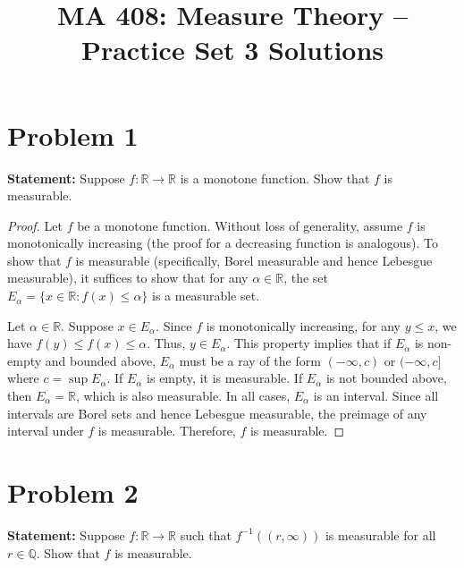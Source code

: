 \documentclass[12pt]{article}
\title{MA 408: Measure Theory -- Practice Set 3 Solutions}
\author{}
\date{}
\begin{document}
\maketitle

\section*{Problem 1}
\textbf{Statement:} Suppose $f:\mathbb{R}\rightarrow\mathbb{R}$ is a monotone function. Show that $f$ is measurable.

\begin{proof}
Let $f$ be a monotone function. Without loss of generality, assume $f$ is monotonically increasing (the proof for a decreasing function is analogous). To show that $f$ is measurable (specifically, Borel measurable and hence Lebesgue measurable), it suffices to show that for any $\alpha \in \mathbb{R}$, the set $E_\alpha = \{x \in \mathbb{R} : f(x) \le \alpha\}$ is a measurable set.

Let $\alpha \in \mathbb{R}$. Suppose $x \in E_\alpha$. Since $f$ is monotonically increasing, for any $y \le x$, we have $f(y) \le f(x) \le \alpha$. Thus, $y \in E_\alpha$. 
This property implies that if $E_\alpha$ is non-empty and bounded above, $E_\alpha$ must be a ray of the form $(-\infty, c)$ or $(-\infty, c]$ where $c = \sup E_\alpha$. 
If $E_\alpha$ is empty, it is measurable. If $E_\alpha$ is not bounded above, then $E_\alpha = \mathbb{R}$, which is also measurable. 
In all cases, $E_\alpha$ is an interval. Since all intervals are Borel sets and hence Lebesgue measurable, the preimage of any interval under $f$ is measurable. Therefore, $f$ is measurable.
\end{proof}

\section*{Problem 2}
\textbf{Statement:} Suppose $f:\mathbb{R}\rightarrow\mathbb{R}$ such that $f^{-1}((r,\infty))$ is measurable for all $r\in\mathbb{Q}$. Show that $f$ is measurable.
\end{document}
